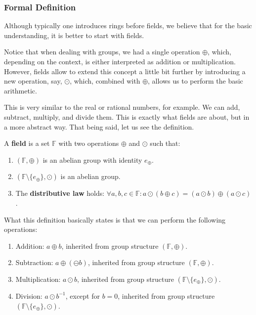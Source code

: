 \documentclass[../lecture-notes.tex]{subfiles}
\begin{document}
\subsubsection{Formal Definition}
Although typically one introduces rings before fields, we believe that for the basic understanding, it is better to start with fields. 

Notice that when dealing with groups, we had a single operation $\oplus$, which, depending on the context, is either interpreted as addition or multiplication. 
However, fields allow to extend this concept a little bit further by introducing a new operation, say, $\odot$, which, combined with $\oplus$, allows us to perform the basic arithmetic.

This is very similar to the real or rational numbers, for example. We can add, subtract, multiply, and divide them. This is exactly what fields are about, but in a more abstract way. That being said, let us see the definition.

\begin{definition}
    A \textbf{field} is a set $\mathbb{F}$ with two operations $\oplus$ and $\odot$ such that:
    \begin{enumerate}
        \item $(\mathbb{F}, \oplus)$ is an abelian group with identity $e_{\oplus}$.
        \item $(\mathbb{F} \setminus \{e_{\oplus}\}, \odot)$ is an abelian group.
        \item The \textbf{distributive law} holds: $\forall a,b,c \in \mathbb{F}: a \odot (b \oplus c) = (a \odot b) \oplus (a \odot c)$.
    \end{enumerate}
\end{definition}

What this definition basically states is that we can perform the following operations:
\begin{enumerate}
    \item Addition: $a \oplus b$, inherited from group structure $(\mathbb{F}, \oplus)$.
    \item Subtraction: $a \oplus (\ominus b)$, inherited from group structure $(\mathbb{F}, \oplus)$.
    \item Multiplication: $a \odot b$, inherited from group structure $(\mathbb{F} \setminus \{e_{\oplus}\}, \odot)$.
    \item Division: $a \odot b^{-1}$, except for $b=0$, inherited from group structure $(\mathbb{F} \setminus \{e_{\oplus}\}, \odot)$.
\end{enumerate}
\end{document}
